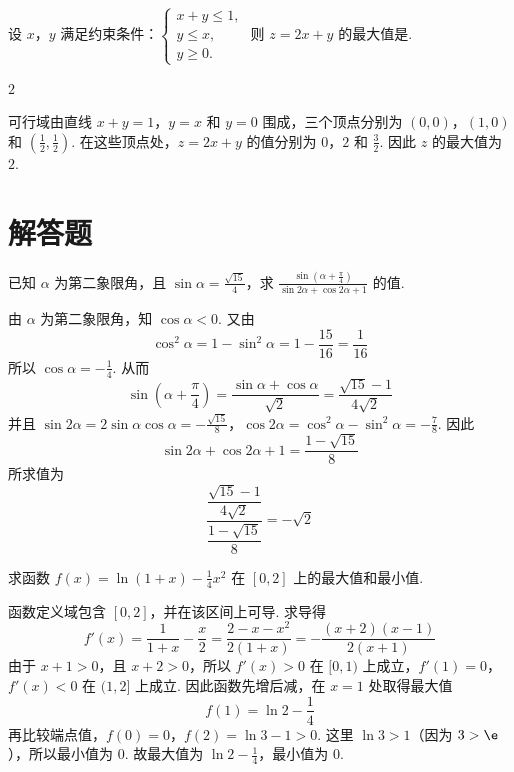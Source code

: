 \begin{problem}
设 \(x\)，\(y\) 满足约束条件：\(\begin{cases}
x + y \leqslant 1,\\
y \leqslant x,\\
y \geqslant 0.
\end{cases}\) 则 \(z = 2x + y\) 的最大值是\fillinblank{}.
\end{problem}

\begin{answer}
\(2\)
\end{answer}

\begin{solution}
可行域由直线 \(x+y=1\)，\(y=x\) 和 \(y=0\) 围成，三个顶点分别为 \((0,0)\)，\((1,0)\) 和 \(\left(\frac12,\frac12\right)\). 在这些顶点处，\(z=2x+y\) 的值分别为 \(0\)，\(2\) 和 \(\frac32\). 因此 \(z\) 的最大值为 \(2\).
\end{solution}

\section{解答题}
\begin{problem}
已知 \(\alpha\) 为第二象限角，且 \(\sin \alpha = \frac{\sqrt{15}}{4}\)，求 \(\frac{\sin\left(\alpha + \frac{\pi}{4}\right)}{\sin 2\alpha + \cos 2\alpha + 1}\) 的值.
\end{problem}

\begin{solution}
由 \(\alpha\) 为第二象限角，知 \(\cos\alpha<0\). 又由
\[
\cos^2\alpha=1-\sin^2\alpha=1-\frac{15}{16}=\frac1{16}
\]
所以 \(\cos\alpha=-\frac14\). 从而
\[
\sin\left(\alpha+\frac\pi4\right)=\frac{\sin\alpha+\cos\alpha}{\sqrt2}=\frac{\sqrt{15}-1}{4\sqrt2}
\]
并且 \(\sin2\alpha=2\sin\alpha\cos\alpha=-\frac{\sqrt{15}}8\)，\(\cos2\alpha=\cos^2\alpha-\sin^2\alpha=-\frac78\). 因此
\[
\sin2\alpha+\cos2\alpha+1=\frac{1-\sqrt{15}}8
\]
所求值为
\[
\frac{\dfrac{\sqrt{15}-1}{4\sqrt2}}{\dfrac{1-\sqrt{15}}8}=-\sqrt2
\]
\end{solution}

\begin{problem}
求函数 \(f(x) = \ln\left(1 + x\right) - \frac{1}{4} x^2 \) 在 \([0,2]\) 上的最大值和最小值.
\end{problem}

\begin{solution}
函数定义域包含 \([0,2]\)，并在该区间上可导. 求导得
\[
f'(x)=\frac1{1+x}-\frac{x}{2}=\frac{2-x-x^2}{2(1+x)}=-\frac{(x+2)(x-1)}{2(x+1)}
\]
由于 \(x+1>0\)，且 \(x+2>0\)，所以 \(f'(x)>0\) 在 \([0,1)\) 上成立，\(f'(1)=0\)，\(f'(x)<0\) 在 \((1,2]\) 上成立. 因此函数先增后减，在 \(x=1\) 处取得最大值
\[
f(1)=\ln2-\frac14
\]
再比较端点值，\(f(0)=0\)，\(f(2)=\ln3-1>0\). 这里 \(\ln3>1\)（因为 \(3>\e\)），所以最小值为 \(0\). 故最大值为 \(\ln2-\frac14\)，最小值为 \(0\).
\end{solution}

